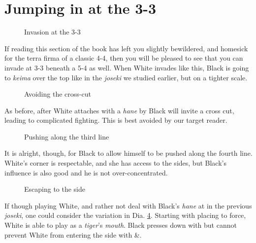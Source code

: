 \documentclass[a5paper,12pt,twoside]{book} %
\newcounter{joseki}                 %
\newcommand{\drefs}[1]{Dia. \ref{#1}}
\newcommand{\addstufftotoc}[2][toc]{%
  \addtocontents{#1}{#2}}
\begin{document}
\section{Jumping in at the 3-3}

\begin{figure}[!htbp]
 
\vspace{-0.6cm}\caption{Invasion at the 3-3}
\label{5-4:3-3-invasion-1}
\end{figure}

If reading this section of the book has left you slightly bewildered, and homesick for the terra firma of a classic 4-4, then you will be pleased to see that you can invade at 3-3 beneath a 5-4 as well. When White invades like this, Black is going to \textit{keima} over the top like in the \textit{joseki} we studied earlier, but on a tighter scale.\\

\begin{figure}[!htbp]
 
\vspace{-0.6cm}\caption{Avoiding the cross-cut}
\label{5-4:3-3-invasion-2}
\end{figure}

As before, after White attaches with{\large\whitestone[3]} a \textit{hane} by Black will invite a cross cut, leading to complicated fighting. This is best avoided by our target reader.\\

\begin{figure}[!htbp]
 
\vspace{-0.6cm}\caption{Pushing along the third line}
\label{5-4:3-3-invasion-3}
\end{figure}

It is alright, though, for Black to allow himself to be pushed along the fourth line. White's corner is respectable, and she has access to the sides, but Black's influence is also good and he is not over-concentrated.\\

\begin{figure}[!htbp]
 
\vspace{-0.6cm}\caption{Escaping to the side}
\label{5-4:3-3-invasion-4}
\end{figure}

\addstufftotoc{\nobreak\smallskip\protect\par}

If though playing White, and rather not deal with Black's \textit{hane} at{\large\blackstone[4]} in the previous \textit{joseki}, one could consider the variation in \drefs{5-4:3-3-invasion-4}. Starting with placing{\large\whitestone[3]} to force{\large\blackstone[4]}, White is able to play{\large\whitestone[5]} as a \textit{tiger}'s \textit{mouth}. Black presses down with{\large\blackstone[6]} but cannot prevent White from entering the side with{\large\whitestone[7]} \&{\large\whitestone[9]}.\\
\end{document}
